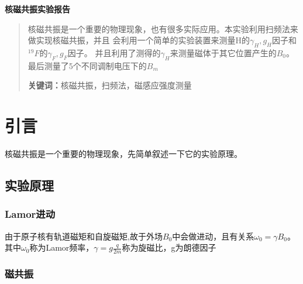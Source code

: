 \documentclass[a4paper,UTF8]{ctexart}
\begin{document}
\begin{center}
    \textbf{\Large 核磁共振实验报告}
    \par {}
\end{center}

\begin{abstract}
    核磁共振是一个重要的物理现象，也有很多实际应用。本实验利用扫频法来做实现核磁共振，并且
    会利用一个简单的实验装置来测量H的$\gamma_{H},g_{H}$因子和$^{19}F$的$\gamma_{F},g_{F}$因子。
    并且利用了测得的$\gamma_H$来测量磁体于其它位置产生的$B_0$。最后测量了5个不同调制电压下的$B_m$
    \par\textbf{关键词：}核磁共振，扫频法，磁感应强度测量
\end{abstract}

\section{引言}

核磁共振是一个重要的物理现象，先简单叙述一下它的实验原理。

\subsection{实验原理}

\subsubsection{Lamor进动}

由于原子核有轨道磁矩和自旋磁矩,故于外场$B_0$中会做进动，且有关系$\omega_0 = \gamma B_0$。
其中$\omega_0$称为Lamor频率，$\gamma = g \frac{q}{2m}$称为旋磁比，g为朗德因子

\subsubsection{磁共振}
\end{document}
